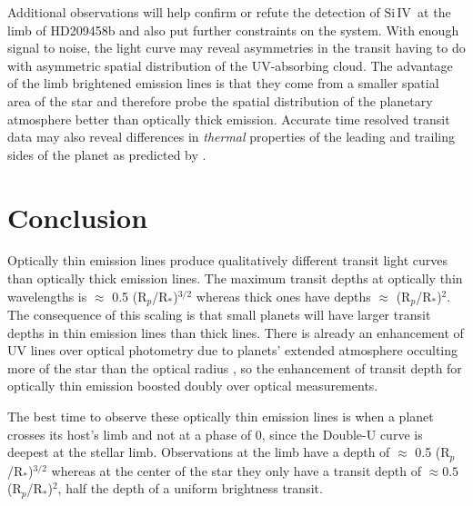 \documentclass[manuscript]{aastex}
\newcommand{\siIV}{\ensuremath{\mathrm{Si}\,\scriptstyle \mathrm{IV}}}
\newcommand{\p}{R$_p$/R$_*$}
\begin{document}
Additional observations will help confirm or refute the detection of \siIV\ at the limb of HD209458b and also put further constraints on the system. With enough signal to noise, the light curve may reveal asymmetries in the transit having to do with asymmetric spatial distribution of the UV-absorbing cloud. The advantage of the limb brightened emission lines is that they come from a smaller spatial area of the star and therefore probe the spatial distribution of the planetary atmosphere better than optically thick emission. Accurate time resolved transit data may also reveal differences in {\it thermal} properties of the leading and trailing sides of the planet as predicted by \citet{fortney}.

\section{Conclusion}

Optically thin emission lines produce qualitatively different transit light curves than optically thick emission lines. The maximum transit depths at optically thin wavelengths is $\approx$ 0.5 (\p )$^{3/2}$ whereas thick ones have depths $\approx$ (\p )$^2$. The consequence of this scaling is that small planets will have larger transit depths in thin emission lines than thick lines. There is already an enhancement of UV lines over optical photometry due  to planets' extended atmosphere occulting more of the star than the optical radius \citep{kosk}, so the enhancement of transit depth for optically thin emission boosted doubly over optical measurements.

The best time to observe these optically thin emission lines is when a planet crosses its host's limb and not at a phase of 0, since the Double-U curve is deepest at the stellar limb. Observations at the limb have a depth of $\approx$ 0.5 (\p )$^{3/2}$ whereas at the center of the star they only have a transit depth of  $\approx 0.5 $(\p)$^2$, half the depth of a uniform brightness transit.
\end{document}
